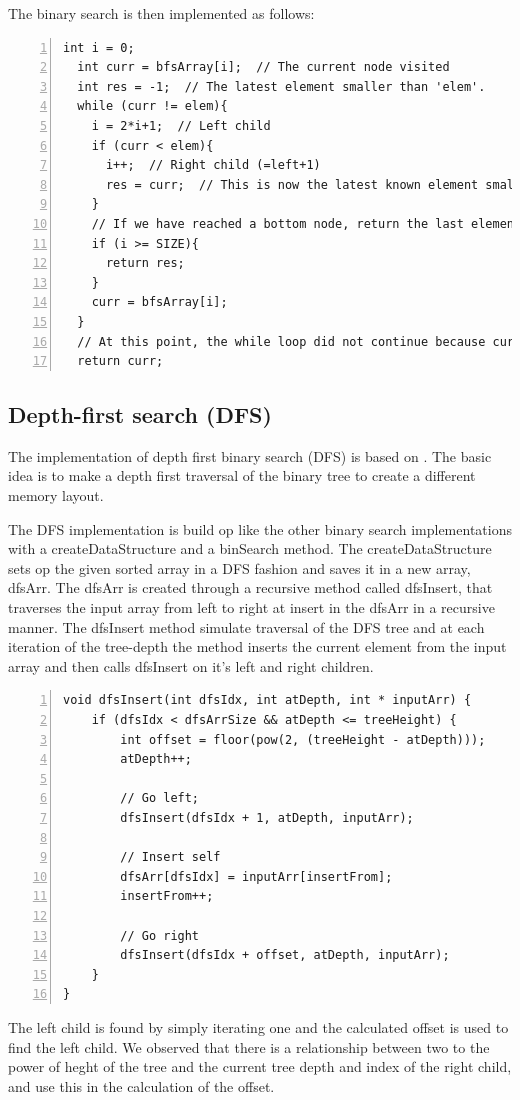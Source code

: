 The binary search is then implemented as follows:
\begin{lstlisting}[numbers=left]
  int i = 0;
  int curr = bfsArray[i];  // The current node visited
  int res = -1;  // The latest element smaller than 'elem'.
  while (curr != elem){
    i = 2*i+1;  // Left child
    if (curr < elem){
      i++;  // Right child (=left+1)
      res = curr;  // This is now the latest known element smaller than 'elem'.
    }
    // If we have reached a bottom node, return the last element lower than 'elem'.
    if (i >= SIZE){
      return res;
    }
    curr = bfsArray[i];
  }
  // At this point, the while loop did not continue because curr==elem
  return curr;
\end{lstlisting}



\subsection{Depth-first search (DFS)}
The implementation of depth first binary search (DFS) is based on \citep{binAlg}. 
The basic idea is to make a depth first traversal of the binary tree to create a different memory layout. 

The DFS implementation is build op like the other binary search implementations with a createDataStructure and a binSearch method. 
The createDataStructure sets op the given sorted array in a DFS fashion and saves it in a new array, dfsArr. 
The dfsArr is created through a recursive method called dfsInsert, that traverses the input array from left to right at insert in the dfsArr in a recursive manner. 
The dfsInsert method simulate traversal of the DFS tree and at each iteration of the tree-depth the method inserts the current element from the input array and then calls dfsInsert on it's left and right children. 
\begin{lstlisting}[numbers=left]
void dfsInsert(int dfsIdx, int atDepth, int * inputArr) {
	if (dfsIdx < dfsArrSize && atDepth <= treeHeight) {
		int offset = floor(pow(2, (treeHeight - atDepth)));
		atDepth++;
		
		// Go left;
		dfsInsert(dfsIdx + 1, atDepth, inputArr);
		
		// Insert self	
		dfsArr[dfsIdx] = inputArr[insertFrom];
		insertFrom++;
		
		// Go right
		dfsInsert(dfsIdx + offset, atDepth, inputArr);
	}
} 
\end{lstlisting}
The left child is found by simply iterating one and the calculated offset is used to find the left child. 
We observed that there is a relationship between two to the power of heght of the tree and the current tree depth and index of the right child, 
and use this in the calculation of the offset.   

